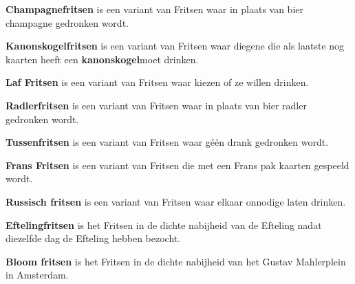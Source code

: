 
\newpage
\drawBar{}

\item \textbf{Champagnefritsen} is een variant van Fritsen waar in plaats van bier champagne gedronken wordt.

\item \textbf{Kanonskogelfritsen} is een variant van Fritsen waar diegene die als laatste nog kaarten heeft een \textbf{kanonskogel}\footnotemark[1] moet drinken.

\item \textbf{Laf Fritsen} is een variant van Fritsen waar \alleSpelers kiezen of ze willen drinken.

\item \textbf{Radlerfritsen} is een variant van Fritsen waar in plaats van bier radler gedronken wordt.

\item \textbf{Tussenfritsen} is een variant van Fritsen waar g\'e\'en drank gedronken wordt.

\item \textbf{Frans Fritsen} is een variant van Fritsen die met een Frans pak kaarten gespeeld wordt.

\item \textbf{Russisch fritsen} is een variant van Fritsen waar \alleSpelers elkaar onnodige laten drinken.

\item \textbf{Eftelingfritsen} is het Fritsen in de dichte nabijheid van de Efteling nadat \alleSpelers diezelfde dag de Efteling hebben bezocht.

\item \textbf{Bloom fritsen} is het Fritsen in de dichte nabijheid van het Gustav Mahlerplein in Amsterdam.
\eindABCLijst


